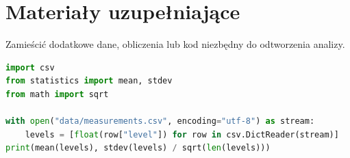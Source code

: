 \section{Materiały uzupełniające}
\label{sec:zalacznik}
Zamieścić dodatkowe dane, obliczenia lub kod niezbędny do odtworzenia analizy.
\begin{lstlisting}[language=Python,caption={Przykład obliczenia średniej i niepewności typu A.},label={lst:analiza}]
import csv
from statistics import mean, stdev
from math import sqrt

with open("data/measurements.csv", encoding="utf-8") as stream:
    levels = [float(row["level"]) for row in csv.DictReader(stream)]
print(mean(levels), stdev(levels) / sqrt(len(levels)))
\end{lstlisting}
